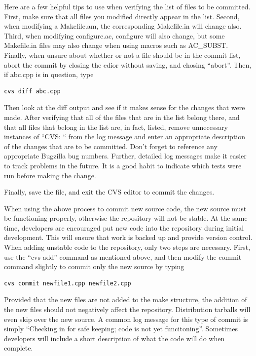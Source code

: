 \documentclass[12pt,relax]{TrilinosDevGuide}
\begin{document}
\begin{enumerate}
Here are a few helpful tips to use when verifying the list of files 
to be committed.  First, make sure that all files you modified directly appear 
in the list.  Second, when modifying a Makefile.am, the corresponding 
Makefile.in will change also.  Third, when modifying configure.ac, configure 
will also change, but some Makefile.in files may also change when using macros 
such as AC\_SUBST.  Finally, when unsure about whether or not a file should be 
in the commit list, abort the commit by closing the edior without saving, and 
chosing ``abort''.  Then, if abc.cpp is in question, type 
\begin{verbatim}
cvs diff abc.cpp
\end{verbatim}
Then look at the diff output and see if it makes sense for the changes that 
were made.  After verifying that all of the files that are in the list belong 
there, and that all files that belong in the list are, in fact, listed, remove 
unnecessary instances of ``CVS: `` from the log message and enter an 
appropriate description of the changes that are to be committed.  Don't forget 
to reference any appropriate Bugzilla bug numbers.  Further, detailed log 
messages make it easier to track problems in the future.  It is a good habit 
to indicate which tests were run before making the change.

Finally, save the file, and exit the CVS editor to commit the changes.

When using the above process to commit new source code, the new source must 
be functioning properly, otherwise the repository will not be stable.  
At the same time, developers are encouraged put new code into the repository 
during initial development.  This will ensure that work is backed up and 
provide version control.  When adding unstable code to the repository, only
two steps are necessary.  First, use the ``cvs add'' command as mentioned 
above, and then modify the commit command slightly to commit only the new 
source by typing
\begin{verbatim}
cvs commit newfile1.cpp newfile2.cpp
\end{verbatim}
Provided that the new files are not added to the make structure, the addition 
of the new files should not negatively affect the repository.  Distribution 
tarballs will even skip over the new source.  A common log message for this 
type of commit is simply ``Checking in for safe keeping; code is not yet 
funcitoning''.  Sometimes developers will include a short description of what 
the code will do when complete.
\end{enumerate}
\end{document}

